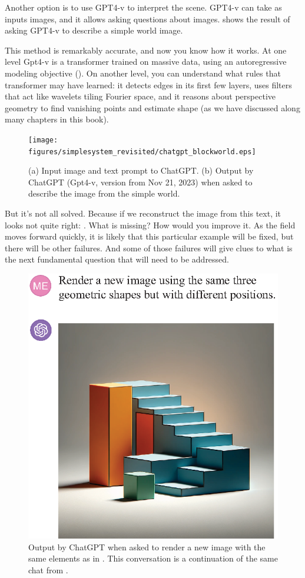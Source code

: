 Another option is to use GPT4-v \cite{openai2023gpt4v} to interpret the scene. GPT4-v can take as inputs images, and it allows asking questions about images. \Fig{\ref{fig:chatgpt_blockworld}} shows the result of asking GPT4-v to describe a simple world image.

This method is remarkably accurate, and now you know how it works. At one level Gpt4-v is a transformer trained on massive data, using an autoregressive modeling objective (\chap{\ref{chapter:transformers}}). On another level, you can understand what rules that transformer may have learned: it detects edges in its first few layers, uses filters that act like wavelets tiling Fourier space, and it reasons about perspective geometry to find vanishing points and estimate shape (as we have discussed along many chapters in this book).



\begin{figure}
    \centerline{
        \texttt{[image: figures/simplesystem\_revisited/chatgpt\_blockworld.eps]}
    }
    \caption{(a) Input image and text prompt to ChatGPT. (b) Output by ChatGPT (Gpt4-v, version from Nov 21, 2023) when asked to describe the image from the simple world.}
    \label{fig:chatgpt_blockworld}
\end{figure}

But it's not all solved. Because if we reconstruct the image from this text, it looks not quite right: \fig{\ref{fig:chatgpt_blockworld2}}. What is missing? How would you improve it. As the field moves forward quickly, it is likely that this particular example will be fixed, but there will be other failures. And some of those failures will give clues to what is the next fundamental question that will need to be addressed.

\begin{figure}
    \centerline{
        \includegraphics[width=.5\linewidth]{figures/simplesystem_revisited/chatgpt_blockworld_2.eps}
    }
    \caption{Output by ChatGPT when asked to render a new image with the same elements as in \fig{\ref{fig:chatgpt_blockworld}}. This conversation is a continuation of the same chat from \fig{\ref{fig:chatgpt_blockworld}}.}
    \label{fig:chatgpt_blockworld2}
\end{figure}

